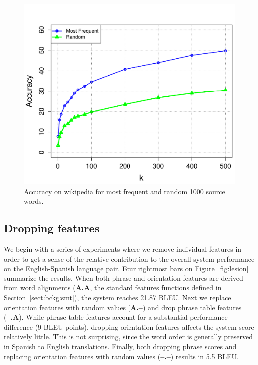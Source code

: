 \documentclass[11pt]{article}
\newcommand{\secref}[1]{Section~\ref{#1}}
\newcommand{\figref}[1]{Figure~\ref{#1}}
\begin{document}
\begin{figure}[t]
\begin{center}
\includegraphics[width=\linewidth]{../figures/lexinduct/lexinduct.pdf}
\caption{Accuracy on wikipedia for most frequent and random 1000 source words. }
\label{fig:lexinduct}
\end{center}
\vskip -0.2in
\end{figure}

\subsection{Dropping features}

We begin with a series of experiments where we remove individual features in order to get a sense of the relative contribution to the overall system performance on the English-Spanish language pair. Four rightmost bars on \figref{fig:lesion} summarize the results.  When both phrase and orientation features are derived from word alignments ({\bf A.A}, the standard features functions defined in \secref{sect:bckg:smt}), the system reaches 21.87 BLEU.  Next we replace orientation features with random values ({\bf A.--}) and drop phrase table features ({\bf --.A}).  While phrase table features account for a substantial performance difference (9 BLEU points), dropping orientation features affects the system score relatively little.  This is not surprising, since the word order is generally preserved in Spanish to English translations.  Finally, both dropping phrase scores and replacing orientation features with random values ({\bf --.--}) results in 5.5 BLEU.
\end{document}
